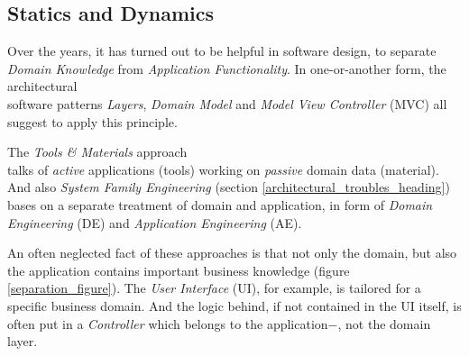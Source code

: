 %
%
%
%
%
%
%

\subsection{Statics and Dynamics}
\label{statics_and_dynamics_heading}

Over the years, it has turned out to be helpful in software design, to separate
\emph{Domain Knowledge} from \emph{Application Functionality}. In
one-or-another form, the architectural\\software patterns \cite{heller2005}
\emph{Layers}, \emph{Domain Model} and \emph{Model View Controller} (MVC) all
suggest to apply this principle.

The \emph{Tools \& Materials} approach \cite{tandm}\\talks of \emph{active}
applications (tools) working on \emph{passive} domain data (material). And also
\emph{System Family Engineering} (section \ref{architectural_troubles_heading})
bases on a separate treatment of domain and application, in form of
\emph{Domain Engineering} (DE) and \emph{Application Engineering} (AE).

An often neglected fact of these approaches is that not only the domain, but
also the application contains important business knowledge (figure
\ref{separation_figure}). The \emph{User Interface} (UI), for example, is
tailored for a specific business domain. And the logic behind, if not
contained in the UI itself, is often put in a \emph{Controller} which belongs
to the application$-$, not the domain layer.

